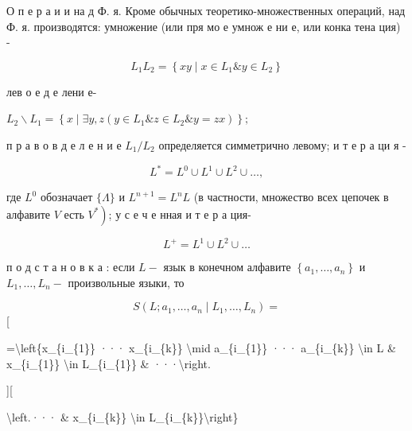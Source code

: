 \documentclass[10pt]{article}
\begin{document}
О п е р а и и на д Ф. я. Кроме обычных теоретико-множественных операций, над Ф. я. производятся: умножение (или пря мо е умнож е ни е, или конка тена ция) -



\[

L_{1} L_{2}=\left\{x y \mid x \in L_{1} \& y \in L_{2}\right\}

\]



лев о е д е лени е-



$L_{2} \backslash L_{1}=\left\{x \mid \exists y, z\left(y \in L_{1} \& z \in L_{2} \& y=z x\right)\right\} ;$



п р а в о в д е л е н и е $L_{1} / L_{2}$ определяется симметрично левому; и т е р а ци я -



\[

L^{*}=L^{0} \cup L^{1} \cup L^{2} \cup \ldots,

\]



где $L^{0}$ обозначает $\{\Lambda\}$ и $L^{n+1}=L^{n} L$ (в частности, множество всех цепочек в алфавите $V$ есть $\left.V^{*}\right)$; у с е ч е нная и т е р а ция-



\[

L^{+}=L^{1} \cup L^{2} \cup \ldots

\]



п о д с т а н о в к а : если $L-$ язык в конечном алфавите $\left\{a_{1}, \ldots, a_{n}\right\}$ и $L_{1}, \ldots, L_{n}-$ произвольные языки, то



\[

S\left(L ; a_{1}, \ldots, a_{n} \mid L_{1}, \ldots, L_{n}\right)=

\][



=\textbackslash left\{x\_\{i\_\{1\}\} ··· x\_\{i\_\{k\}\} \textbackslash mid a\_\{i\_\{1\}\} ··· a\_\{i\_\{k\}\} \textbackslash in L \& x\_\{i\_\{1\}\} \textbackslash in L\_\{i\_\{1\}\} \& ···\textbackslash right.



][



\textbackslash left.··· \& x\_\{i\_\{k\}\} \textbackslash in L\_\{i\_\{k\}\}\textbackslash right\}
\end{document}
